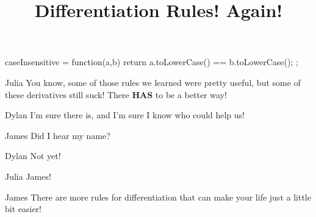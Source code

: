 \documentclass{ximera}
\title{Differentiation Rules! Again!}
\begin{document}
\maketitle
\begin{javascript}
 caseInsensitive = function(a,b) {
    return a.toLowerCase() == b.toLowerCase();
  };
\end{javascript}
\begin{dialogue}
\item[Julia] You know, some of those rules we learned were pretty useful, but some of these derivatives still suck! There \textbf{HAS} to be a better way!
\item[Dylan] I'm sure there is, and I'm sure I know who could help us!
\item[James] Did I hear my name?
\item[Dylan] Not yet!
\item[Julia] James!
\item[James] There are more rules for differentiation that can make your life just a little bit easier!
\end{dialogue}
\end{document}
